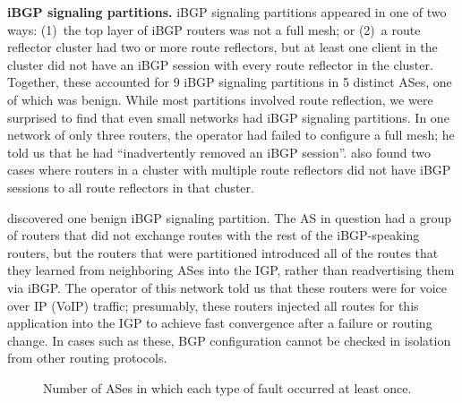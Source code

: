 {\bf iBGP signaling partitions.}  
iBGP signaling partitions appeared in one of two ways: (1)~the top layer
of iBGP routers was not a full mesh; or (2)~a route reflector cluster had
two or more route reflectors, but at least one client in the cluster did
not have an iBGP session with every route reflector in the cluster.
Together, these accounted for $9$ iBGP signaling partitions in 5
distinct ASes, one of which was benign. While most 
partitions involved route reflection, we were surprised to find that
even small networks had iBGP signaling partitions.  In one network of
only three routers, the operator had failed to configure a full mesh; he
told us that he had ``inadvertently removed an iBGP session''.
\rcc also 
found two cases where routers in a cluster with multiple route
reflectors did not have iBGP sessions to all route reflectors in that
cluster.

\rcc discovered one benign iBGP signaling partition.  The AS in question
had a
group of routers that did not exchange routes with the rest of the
iBGP-speaking routers, but the routers that were partitioned introduced
all 
of the routes that they learned from neighboring ASes into the IGP,
rather than readvertising them via iBGP.  The operator of this network
told us that these routers were for voice over IP (VoIP) traffic; presumably,
these routers injected all routes for this application into the IGP to
achieve fast convergence after a failure or routing change.  
In cases such as these, BGP configuration cannot be checked in isolation
from other routing protocols.

\begin{figure}[t!]
\centering{}
\caption{Number of ASes in which each type of fault occurred
  at least once.  
} 
\label{fig:err_by_as}
\end{figure}





